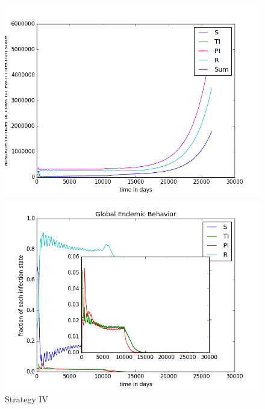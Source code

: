 \begin{figure}[htbp]
\begin{minipage}{0.5\textwidth}
\centering
\noindent\includegraphics[width=0.95\linewidth,height=\textheight,
keepaspectratio]{cont4totalEndemicNumbers.png} 
\end{minipage}
\begin{minipage}{0.5\textwidth}
\centering
\noindent\includegraphics[width=0.95\linewidth,height=\textheight,
keepaspectratio]{cont4endemicFractions.png} 
\end{minipage}
\caption[Endemic Behavior in Containment Strategy Four]{Strategy IV}
\label{fig:contStrat4}
\end{figure}

